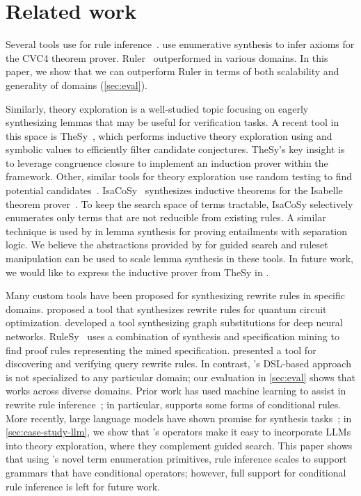 \section{Related work}
\label{sec:related}

Several tools use \egraphs for rule inference~\citep{sat19, ruler}.
\citet{sat19} use enumerative
  synthesis to infer axioms for the CVC4 theorem prover.
Ruler~\citep{ruler} outperformed \citet{sat19}
  in various domains.
  In this paper,
  we show that we can outperform Ruler in terms of both
  scalability and generality of domains (\autoref{sec:eval}).

Similarly, theory exploration is a well-studied topic
 focusing on eagerly synthesizing
 lemmas that may be useful for
 verification tasks.
A recent tool in this space is
  TheSy~\citep{cav21}, which performs 
  inductive theory exploration using
  \eqsat and symbolic values
  to efficiently filter candidate conjectures.
TheSy's key insight is to leverage congruence closure
 to implement an induction prover within the
 \eqsat framework.
Other, similar tools for theory exploration
 use random testing to find
 potential candidates~\citep{hipspec, quickspec}.
IsaCoSy~\citep{isacosy} synthesizes inductive
  theorems for the Isabelle theorem prover~\citep{isabelle}.
To keep the search space of terms tractable,
  IsaCoSy selectively enumerates only terms that
  are not reducible from existing rules.
A similar technique is used by \citet{seplogic}
  in lemma synthesis for proving
  entailments with separation logic.
We believe the abstractions provided by \enumo for
  guided search and ruleset manipulation
  can be used to scale lemma synthesis
  in these tools.
In future work, we would like to express the
inductive prover from  TheSy
 in \enumo.

Many custom tools have been proposed
  for synthesizing rewrite rules in
  specific domains.
\citet{queso} proposed a tool that
  synthesizes rewrite rules for
  quantum circuit optimization.
\citet{taso19} developed a tool synthesizing
  graph substitutions for deep neural networks.
RuleSy~\citep{rulesy} uses a combination of
synthesis and specification mining to find
proof rules representing the mined
specification.
\citet{wetune} presented a tool for
  discovering and verifying query rewrite rules.
In contrast,
  \enumo's DSL-based approach is
  not specialized to any particular domain;
  our evaluation in \autoref{sec:eval}
  shows that \enumo works across diverse domains.
Prior work has used machine learning to assist in
  rewrite rule inference~\citep{oopsla22-logic, swapper};
in particular, \citet{swapper} supports some
  forms of conditional rules.
More recently, large language models have shown promise
  for synthesis tasks~\citep{hysynth, asap, shraddha};
  in \autoref{sec:case-study-llm}, we show that \enumo's
  operators make it easy to incorporate LLMs into
  theory exploration, where they complement guided search.
This paper shows that using \enumo's novel term enumeration
  primitives, rule inference scales
  to support grammars that have conditional
  operators; however,
  full support for conditional rule inference
  is left for future work.

